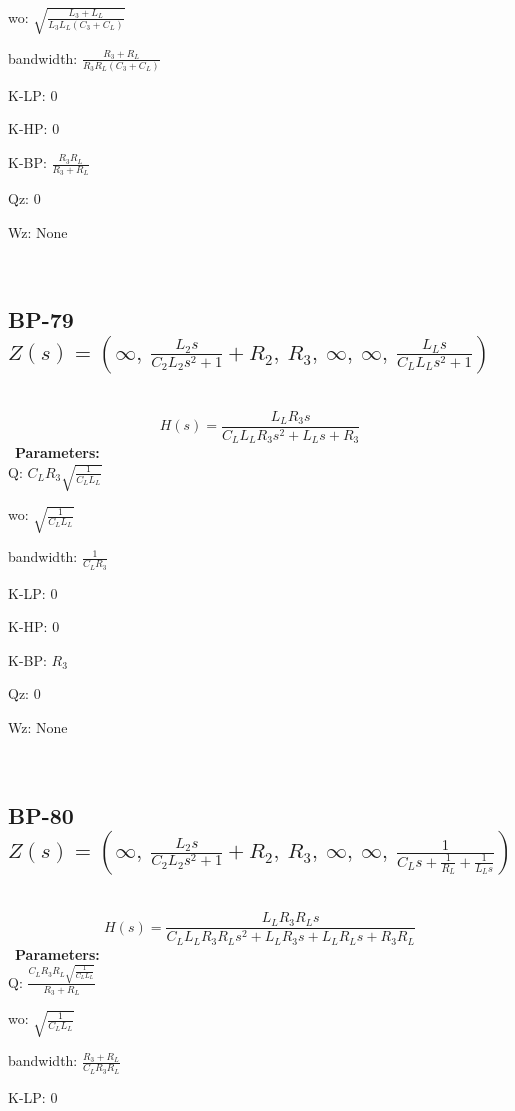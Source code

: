 \documentclass{article}
\begin{document}
wo: $\sqrt{\frac{L_{3} + L_{L}}{L_{3} L_{L} \left(C_{3} + C_{L}\right)}}$\ 

bandwidth: $\frac{R_{3} + R_{L}}{R_{3} R_{L} \left(C_{3} + C_{L}\right)}$\ 

K-LP: $0$\ 

K-HP: $0$\ 

K-BP: $\frac{R_{3} R_{L}}{R_{3} + R_{L}}$\ 

Qz: $0$\ 

Wz: $\text{None}$\ 

\ 

\subsection{BP-79 $Z(s) = \left( \infty, \  \frac{L_{2} s}{C_{2} L_{2} s^{2} + 1} + R_{2}, \  R_{3}, \  \infty, \  \infty, \  \frac{L_{L} s}{C_{L} L_{L} s^{2} + 1}\right)$ } \ 
\textbf{\[H(s) = \frac{L_{L} R_{3} s}{C_{L} L_{L} R_{3} s^{2} + L_{L} s + R_{3}}\] } \ 
\textbf{Parameters:}\\ 

Q: $C_{L} R_{3} \sqrt{\frac{1}{C_{L} L_{L}}}$\ 

wo: $\sqrt{\frac{1}{C_{L} L_{L}}}$\ 

bandwidth: $\frac{1}{C_{L} R_{3}}$\ 

K-LP: $0$\ 

K-HP: $0$\ 

K-BP: $R_{3}$\ 

Qz: $0$\ 

Wz: $\text{None}$\ 

\ 

\subsection{BP-80 $Z(s) = \left( \infty, \  \frac{L_{2} s}{C_{2} L_{2} s^{2} + 1} + R_{2}, \  R_{3}, \  \infty, \  \infty, \  \frac{1}{C_{L} s + \frac{1}{R_{L}} + \frac{1}{L_{L} s}}\right)$ } \ 
\textbf{\[H(s) = \frac{L_{L} R_{3} R_{L} s}{C_{L} L_{L} R_{3} R_{L} s^{2} + L_{L} R_{3} s + L_{L} R_{L} s + R_{3} R_{L}}\] } \ 
\textbf{Parameters:}\\ 

Q: $\frac{C_{L} R_{3} R_{L} \sqrt{\frac{1}{C_{L} L_{L}}}}{R_{3} + R_{L}}$\ 

wo: $\sqrt{\frac{1}{C_{L} L_{L}}}$\ 

bandwidth: $\frac{R_{3} + R_{L}}{C_{L} R_{3} R_{L}}$\ 

K-LP: $0$\ 
\end{document}
